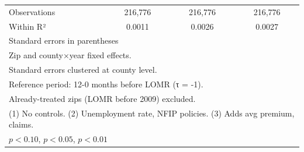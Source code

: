 \begin{table}[htbp]
\begin{tabular}{l*{3}{c}}
\hline
Observations        &     216,776         &     216,776         &     216,776         \\
Within R²           &      0.0011         &      0.0026         &      0.0027         \\
\hline\hline
\multicolumn{4}{l}{\footnotesize Standard errors in parentheses}\\
\multicolumn{4}{l}{\footnotesize Zip and county×year fixed effects.}\\
\multicolumn{4}{l}{\footnotesize Standard errors clustered at county level.}\\
\multicolumn{4}{l}{\footnotesize Reference period: 12-0 months before LOMR (τ = -1).}\\
\multicolumn{4}{l}{\footnotesize Already-treated zips (LOMR before 2009) excluded.}\\
\multicolumn{4}{l}{\footnotesize (1) No controls. (2) Unemployment rate, NFIP policies. (3) Adds avg premium, claims.}\\
\multicolumn{4}{l}{\footnotesize \sym{*} \(p<0.10\), \sym{**} \(p<0.05\), \sym{***} \(p<0.01\)}\\
\end{tabular}
\end{table}
